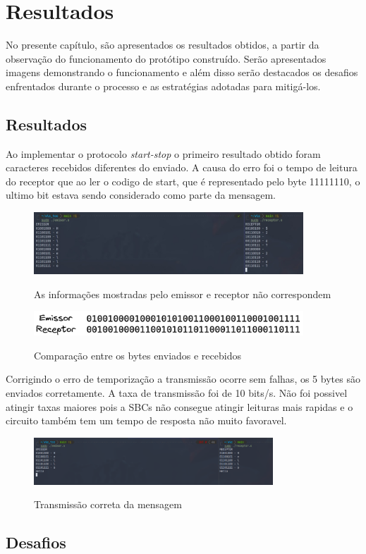 \section{Resultados}


No presente capítulo, são apresentados os resultados obtidos, a partir da observação do funcionamento do protótipo construído. Serão apresentados imagens demonstrando o funcionamento e além disso serão destacados os desafios enfrentados durante o processo e as estratégias adotadas para mitigá-los.

\subsection{Resultados}

Ao implementar o protocolo \textit{start-stop} o primeiro resultado obtido foram caracteres recebidos diferentes do enviado. A causa do erro foi o tempo de leitura do receptor que ao ler o codigo de start, que é representado pelo byte 11111110, o ultimo bit estava sendo considerado como parte da mensagem.

\begin{figure}[!htbp]
  \caption{As informações mostradas pelo emissor e receptor não correspondem}
  \includegraphics[width=0.9\textwidth]{images/vlc_erro_1.jpeg}
  \label{primeiro_erro}
\end{figure}

\begin{figure}[!htbp]
  \caption{Comparação entre os bytes enviados e recebidos}
  \includegraphics[width=0.9\textwidth]{images/comparacao_msg_emissor_recptor_erro.png}
  \label{comparaca_msg_emissor_recptor_erro}
\end{figure}

Corrigindo o erro de temporização a transmissão ocorre sem falhas, os 5 bytes são enviados corretamente. A taxa de transmissão foi de 10 bits/s. Não foi possivel atingir taxas maiores pois a SBCs não consegue atingir leituras mais rapidas e o circuito também tem um tempo de resposta não muito favoravel.

\begin{figure}[!htbp]
  \caption{Transmissão correta da mensagem}
  \includegraphics[width=0.8\textwidth]{images/vlc_run.png}
  \label{vlc_funcionando}
\end{figure}

\newpage

\subsection{Desafios}
